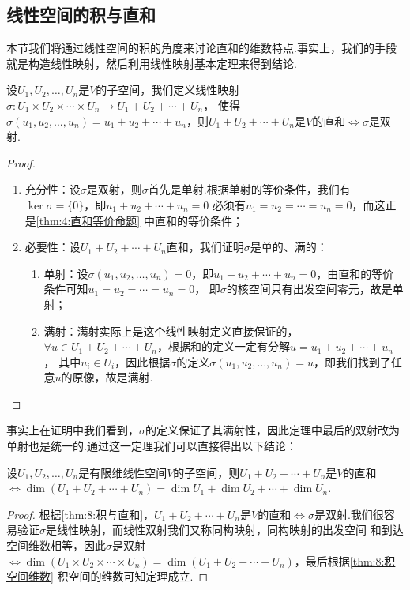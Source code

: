 \subsection{线性空间的积与直和}
本节我们将通过线性空间的积的角度来讨论直和的维数特点.事实上，我们的手段就是构造线性映射，然后利用线性映射基本定理来得到结论.
\begin{theorem}\label{thm:8:积与直和}
    设$U_1,U_2,\ldots,U_n$是$V$的子空间，我们定义线性映射$\sigma:U_1 \times U_2 \times \cdots \times U_n \to U_1+U_2+\cdots+U_n$，
    使得$\sigma(u_1,u_2,\ldots,u_n)=u_1+u_2+\cdots+u_n$，则$U_1+U_2+\cdots+U_n$是$V$的直和$\iff \sigma$是双射.
\end{theorem}
\begin{proof}
    \begin{enumerate}
        \item 充分性：设$\sigma$是双射，则$\sigma$首先是单射.根据单射的等价条件，我们有$\ker \sigma=\{0\}$，即$u_1+u_2+\cdots+u_n=0$
        必须有$u_1=u_2=\cdots=u_n=0$，而这正是\autoref{thm:4:直和等价命题} 中直和的等价条件；

        \item 必要性：设$U_1+U_2+\cdots+U_n$直和，我们证明$\sigma$是单的、满的：
        \begin{enumerate}[label=(\arabic*)]
            \item 单射：设$\sigma(u_1,u_2,\ldots,u_n)=0$，即$u_1+u_2+\cdots+u_n=0$，由直和的等价条件可知$u_1=u_2=\cdots=u_n=0$，
            即$\sigma$的核空间只有出发空间零元，故是单射；
            \item 满射：满射实际上是这个线性映射定义直接保证的，$\forall u \in U_1+U_2+\cdots+U_n$，根据和的定义一定有分解$u=u_1+u_2+\cdots+u_n$，
            其中$u_i \in U_i$，因此根据$\sigma$的定义$\sigma(u_1,u_2,\ldots,u_n)=u$，即我们找到了任意$u$的原像，故是满射.
        \end{enumerate}
    \end{enumerate}
\end{proof}

事实上在证明中我们看到，$\sigma$的定义保证了其满射性，因此定理中最后的双射改为单射也是统一的.通过这一定理我们可以直接得出以下结论：
\begin{theorem}
    设$U_1,U_2,\ldots,U_n$是有限维线性空间$V$的子空间，则$U_1+U_2+\cdots+U_n$是$V$的直和$\iff \dim(U_1+U_2+\cdots+U_n)=\dim U_1+\dim U_2+\cdots+\dim U_n$.
\end{theorem}
\begin{proof}
    根据\autoref{thm:8:积与直和}，$U_1+U_2+\cdots+U_n$是$V$的直和$\iff \sigma$是双射.我们很容易验证$\sigma$是线性映射，而线性双射我们又称同构映射，同构映射的出发空间
    和到达空间维数相等，因此$\sigma$是双射$\iff \dim(U_1 \times U_2 \times \cdots \times U_n)=\dim(U_1+U_2+\cdots+U_n)$，最后根据\autoref{thm:8:积空间维数}
    积空间的维数可知定理成立.
\end{proof}


